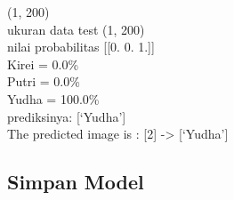 \documentclass[
  letterpaper,
  DIV=11,
  numbers=noendperiod]{scrreprt}
\begin{document}
\begin{figure}
\begin{minipage}[t]{0.33\linewidth}
{{}

}

\end{minipage}%
%
\begin{minipage}[t]{0.33\linewidth}

{\centering 


}

\end{minipage}%

\end{figure}

(1, 200)\\
ukuran data test (1, 200)\\
nilai probabilitas {[}{[}0. 0. 1.{]}{]}\\
Kirei = 0.0\%\\
Putri = 0.0\%\\
Yudha = 100.0\%\\
prediksinya: {[}`Yudha'{]}\\
The predicted image is : {[}2{]} -\textgreater{} {[}`Yudha'{]}

\hypertarget{simpan-model-2}{%
\subsection*{Simpan Model}\label{simpan-model-2}}
\end{document}
